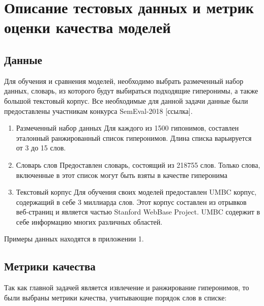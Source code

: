 \section{Описание тестовых данных и метрик оценки качества моделей}
\label{sec:Chapter_3} 
\large


\subsection{Данные}

Для обучения и сравнения моделей, необходимо выбрать размеченный набор данных,
словарь, из которого будут выбираться подходящие гиперонимы, а также большой
текстовый корпус.
Все необходимые для данной задачи данные были предоставлены участникам конкурса
SemEval-2018 [ссылка].

\begin{enumerate}
\item Размеченный набор данных
Для каждого из 1500 гипонимов, составлен эталонный ранжированный список
гиперонимов. Длина списка варьируется от 3 до 15 слов.
\item Словарь слов
Предоставлен словарь, состоящий из 218755 слов. Только слова, включенные в
этот список могут быть взяты в качестве гиперонима
\item Текстовый корпус
Для обучения своих моделей предоставлен UMBC корпус, содержащий в себе 3
миллиарда слов. Этот корпус составлен из отрывков веб-страниц и является частью
Stanford WebBase Project. UMBC содержит в себе информацию многих различных
областей.
\end{enumerate}

Примеры данных находятся в приложении 1.


\subsection{Метрики качества}

Так как главной задачей является извлечение и ранжирование гиперонимов, то были
выбраны метрики качества, учитывающие порядок слов в списке:

